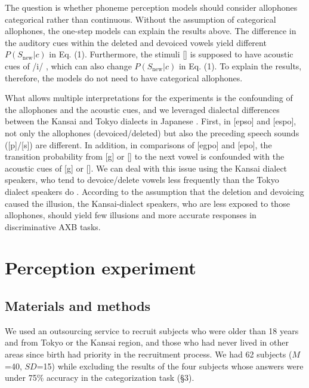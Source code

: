 \documentclass[a4paper,11pt,twocolumn]{article}
\begin{document}
The question is whether phoneme perception models should consider allophones categorical rather than continuous. Without the assumption of categorical allophones, the one-step models can explain the results above. The difference in the auditory cues within the deleted and devoiced vowels yield different $P(S_{\text{new}}|c)$ in Eq. (1). Furthermore, the stimuli [\textctc] is supposed to have acoustic cues of /i/ \cite{kubozono1999japanese_eng}, which can also change $P(S_{\text{new}}|c)$ in Eq. (1). To explain the results, therefore, the models do not need to have categorical allophones.

What allows multiple interpretations for the experiments is the confounding of the allophones and the acoustic cues, and we leveraged dialectal differences between the Kansai and Tokyo dialects in Japanese \cite{kishiyama2022onestep}. First, in [ep\textsubring{\textturnm}so] and [espo], not only the allophones (devoiced/deleted) but also the preceding speech sounds ([p]/[s]) are different. In addition, in comparisons of [egpo] and [e\textctc{}po], the transition probability from [g] or [\textctc] to the next vowel is confounded with the acoustic cues of [g] or [\textctc]. We can deal with this issue using the Kansai dialect speakers, who tend to devoice/delete vowels less frequently than the Tokyo dialect speakers do \cite{byun2011_eng, byun2012_eng}. According to the assumption that the deletion and devoicing caused the illusion, the Kansai-dialect speakers, who are less exposed to those allophones, should yield few illusions and more accurate responses in discriminative AXB tasks.

\section{Perception experiment}


\subsection{Materials and methods}

We used an outsourcing service to recruit subjects who were older than 18 years and from Tokyo or the Kansai region, and those who had never lived in other areas since birth had priority in the recruitment process. We had 62 subjects ($M$=40, $SD$=15) while excluding the results of the four subjects whose answers were under 75\% accuracy in the categorization task (\S3).
\end{document}
